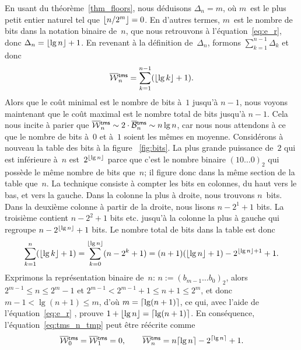 En usant du théorème~\vref{thm_floors}, nous déduisons \(\Delta_n =
m\), où \(m\)~est le plus petit entier naturel tel que \(\lfloor{n/2^m}\rfloor
= 0\). En d'autres termes, \(m\)~est le nombre de bits dans la
notation binaire de~\(n\), que nous retrouvons à
l'équation~\eqref{eq:e_r}, donc \(\Delta_n = \lfloor{\lg n}\rfloor +
1\). En revenant à la définition de~\(\Delta_n\), formons
\(\sum_{k=1}^{n-1}\Delta_k\) et donc
\begin{equation}
\OW{\fun{tms}}{n} = \sum_{k=1}^{n-1}(\floor{\lg k}+1).
\label{eq:tms_n_tmp}
\end{equation}
Alors que le coût minimal est le nombre de bits à~\(1\) jusqu'à
\(n-1\), nous voyons maintenant que le coût maximal est le nombre
total de bits jusqu'à \(n-1\). Cela nous incite à parier que
\(\OW{\fun{tms}}{n} \sim 2 \cdot \OB{\fun{tms}}{n} \sim n\lg n\), car
nous nous attendons à ce que le nombre de bits à~\(0\) et à~\(1\)
soient les mêmes en moyenne. Considérons à nouveau la table des bits à
la figure \fig~\vref{fig:bits}. La plus grande puissance de~\(2\) qui
est inférieure à~\(n\) est~\(2^{\lfloor{\lg n}\rfloor}\) parce que c'est le
nombre binaire \((10\dots0)_2\) qui possède le même nombre de bits
que~\(n\); il figure donc dans la même section de la table
que~\(n\). La technique consiste à compter les bits en colonnes, du
haut vers le bas, et vers la gauche. Dans la colonne la plus à droite,
nous trouvons \(n\)~bits. Dans la deuxième colonne à partir de la
droite, nous lisons \(n-2^1+1\) bits. La troisième contient
\(n-2^2+1\) bits etc. jusqu'à la colonne la plus à gauche qui regroupe
\(n-2^{\lfloor{\lg n}\rfloor}+1\) bits. Le nombre total de bits dans la table
est donc
\begin{equation*}
\sum_{k=1}^{n}{\!(\lfloor{\lg k}\rfloor+1)}
   = \sum_{k=0}^{\lfloor{\lg n}\rfloor}{\!(n-2^k+1)}
   = (n + 1)(\lfloor{\lg n}\rfloor + 1) - 2^{\lfloor{\lg n}\rfloor+1} + 1.
\end{equation*}
Exprimons la représentation binaire de~\(n\): \(n := (b_{m-1}\dots
b_0)_2\), alors \(2^{m-1} \leqslant n \leqslant 2^m - 1\) et \(2^{m-1}
< 2^{m-1} + 1 \leqslant n + 1 \leqslant 2^m\), et donc \(m-1 < \lg(n+1)
\leqslant m\), d'où \(m = \lceil{\lg(n+1)}\rceil\), ce qui, avec l'aide de
l'équation~\eqref{eq:e_r} , prouve \(1 + \lfloor{\lg
  n}\rfloor = \lceil{\lg(n+1)}\rceil\). En conséquence,
l'équation~\eqref{eq:tms_n_tmp} peut être réécrite comme
\begin{equation}
\OW{\fun{tms}}{0} = \OW{\fun{tms}}{1} = 0,
\qquad
\OW{\fun{tms}}{n} = n\ceiling{\lg n} - 2^{\ceiling{\lg n}} + 1.
\label{eq:top}
\end{equation}
